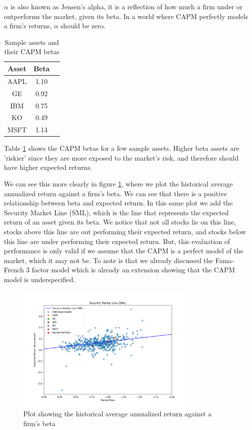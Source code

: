 $\alpha$ is also known as Jensen's alpha, it is a reflection of how much a firm under or outperforms the market, given its beta.
In a world where CAPM perfectly models a firm's returns, $\alpha$ should be zero.

\begin{table}
    \centering
    \begin{tabular}{|c|c|c|}
        \hline
        \textbf{Asset} & \textbf{Beta}\\
        \hline
        AAPL & 1.10\\
        GE & 0.92\\
        IBM & 0.75\\
        KO & 0.49\\
        MSFT & 1.14\\
        \hline
    \end{tabular}
    \caption{Sample assets and their CAPM betas}
    \label{tab:sample_assets_capm}
\end{table}

Table \ref{tab:sample_assets_capm} shows the CAPM betas for a few sample assets. Higher beta assets are 'riskier' since they are more 
exposed to the market's risk, and therefore should have higher expected returns.

We can see this more clearly in figure \ref{fig:historical_expected_returns_vs_beta}, where we plot the historical 
average annualized return against a firm's beta. We can see that there is a positive relationship between beta and expected return.
In this same plot we add the Security Market Line (SML), which is the line that represents the expected return of an asset given its beta.
We notice that not all stocks lie on this line, stocks above this line are out performing their expected return, and stocks below this line are under performing their expected return.
But, this evaluation of performance is only valid if we assume that the CAPM is a perfect model of the market, which it may not be.
To note is that we already discussed the Fama-French 3 factor model which is already an extension showing that the CAPM model is underspecified.

\begin{figure}
    \centering
    \includegraphics[width=0.8\textwidth]{../figs/historical_expected_returns_vs_beta.png}
    \caption{Plot showing the historical average annualized return against a firm's beta}
    \label{fig:historical_expected_returns_vs_beta}
\end{figure}

